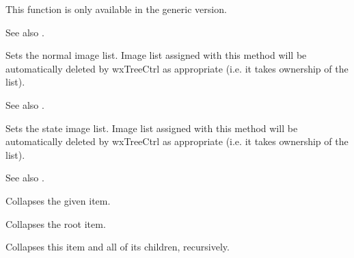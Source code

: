 This function is only available in the generic version.

See also .


\label{wxtreectrlassignimagelist}


Sets the normal image list. Image list assigned with this method will
be automatically deleted by wxTreeCtrl as appropriate
(i.e. it takes ownership of the list).

See also .


\label{wxtreectrlassignstateimagelist}


Sets the state image list. Image list assigned with this method will
be automatically deleted by wxTreeCtrl as appropriate
(i.e. it takes ownership of the list).

See also .



\label{wxtreectrlcollapse}


Collapses the given item.


\label{wxtreectrlcollapseall}


Collapses the root item.




\label{wxtreectrlcollapseallchildren}


Collapses this item and all of its children, recursively.




\label{wxtreectrlcollapseandreset}

